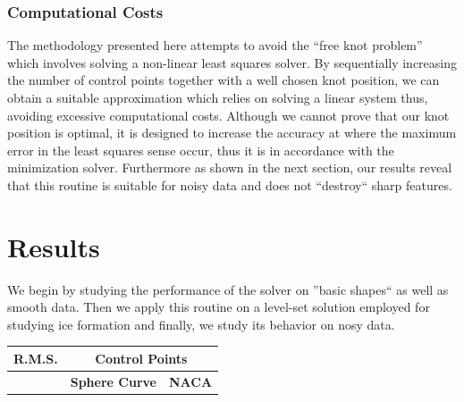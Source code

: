 {\subsubsection{Computational Costs}
The methodology presented here attempts to avoid the ``free knot problem'' which involves solving a non-linear 
least squares solver. By sequentially increasing the number of control points together with a well chosen knot 
position, we can obtain a suitable approximation which relies on solving a linear system thus, avoiding excessive 
computational costs. Although we cannot prove that our knot position is optimal, it is designed to increase the accuracy 
 at where the maximum error in the least squares sense occur,
  thus it is in accordance with the minimization solver. 
  Furthermore as shown in the next section, our results reveal that this routine is suitable for 
   noisy data and does not ``destroy`` sharp features. 
   
   
\section{Results}
We begin by studying the performance of the solver on ''basic shapes`` as well as smooth data. 
Then we apply this routine on a level-set solution employed for studying ice formation and finally, we study 
 its behavior on nosy data. 
 

 \begin{table}
 \centering
  \begin{tabular}{||c||c c || c c ||}
  \hline
 R.M.S.  &\multicolumn{4}{c||}{Control Points}\\
 \hline
  &\multicolumn{2}{c||}{\textbf{Sphere Curve}} & \multicolumn{2}{c||}{\textbf{NACA}}\\


\end{tabular}
\end{table}}
